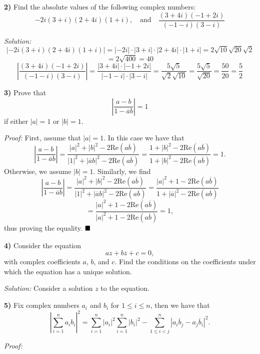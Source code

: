 \documentclass[12pt]{article}
\newcommand{\vertb}[1]{\left\vert#1\right\vert}
\renewcommand{\Re}{\text{Re}}
\newcommand{\solution}{\textit{Solution: }}
\newcommand{\proof}{\textit{Proof: }}
\newcommand{\done}{\ensuremath{\strut\hfill\blacksquare}}
\newcommand{\ovl}[1]{\ensuremath{\overline{#1}}}
\begin{document}
\textbf{2)}
Find the absolute values of the following complex numbers:
\[
	-2i(3 + i)(2 + 4i)(1 + i), \quad \text{and} \quad
	\frac{(3 + 4i)(-1 + 2i)}{(-1 - i)(3 - i)}
\]

\solution
\[
	\vertb{-2i(3 + i)(2 + 4i)(1 + i)}
	= \vertb{-2i} \cdot \vertb{3 + i} \cdot \vertb{2 + 4i}\cdot \vertb{1 + i}
	= 2 \sqrt{10} \sqrt{20} \sqrt{2}
\]
\[
	= 2 \sqrt{400} = \boxed{40}
\]
\[
	\vertb{\frac{(3 + 4i)(-1 + 2i)}{(-1 - i)(3 - i)}}
	= \frac{
		\vertb{3 + 4i} \cdot \vertb{-1 + 2i}
	}{
		\vertb{-1 - i} \cdot \vertb{3 - i}
	}
	= \frac{5\sqrt{5}}{\sqrt{2}\sqrt{10}}
	= \frac{5 \sqrt{5}}{\sqrt{20}}
	= \frac{50}{20}
	= \boxed{\frac{5}{2}}
\]

\textbf{3)}
Prove that
\[
	\vertb{\frac{a - b}{1 - \ovl{a}{b}}} = 1
\]
if either \( \vertb{a} = 1 \) or \( \vertb{b} = 1 \).

\proof
First, assume that \( \vertb{a} = 1 \).
In this case we have that
\[
	\vertb{\frac{a - b}{1 - \ovl{a}{b}}}
	= \frac{
		\vertb{a}^2 + \vertb{b}^2 - 2\Re(a\ovl{b})
	}{
		\vertb{1}^2 + \vertb{\ovl{a}b}^2 - 2\Re(a\ovl{b})
	}
	= \frac{
		1 + \vertb{b}^2 - 2\Re(a\ovl{b})
	}{
		1 + \vertb{b}^2 - 2\Re(a\ovl{b})
	}
	= 1.
\]
Otherwise, we assume \( \vertb{b} = 1 \).
Similarly, we find
\[
	\vertb{\frac{a - b}{1 - \ovl{a}{b}}}
	= \frac{
		\vertb{a}^2 + \vertb{b}^2 - 2\Re(a\ovl{b})
	}{
		\vertb{1}^2 + \vertb{\ovl{a}b}^2 - 2\Re(a\ovl{b})
	}
	= \frac{
		\vertb{a}^2 + 1 - 2\Re(a\ovl{b})
	}{
		1 + \vertb{\ovl{a}}^2 - 2\Re(a\ovl{b})
	}
\]
\[
	= \frac{
		\vertb{a}^2 + 1 - 2\Re(a\ovl{b})
	}{
		\vertb{a}^2 + 1 - 2\Re(a\ovl{b})
	}
	= 1,
\]
thus proving the equality.
\done

\textbf{4)}
Consider the equation
\[
	az + b\ovl{z} + c = 0,
\]
with complex coefficients \( a \), \( b \), and \( c \).
Find the conditions on the coefficients under which the equation has a unique
solution.

\solution
Consider a solution \( z \) to the equation.


\textbf{5)}
Fix complex numbers \( a_i \) and \( b_i \) for \( 1 \leq i \leq n \), then
we have that
\[
	\vertb{\sum_{i = 1}^n a_ib_i}^2
	= \sum_{i = 1}^n \vertb{a_i}^2 \sum_{i = 1}^n \vertb{b_i}^2
	- \sum_{1 \leq i < j}^n \vertb{a_i\ovl{b}_j - a_j\ovl{b}_i}^2.
\]

\proof
\end{document}
